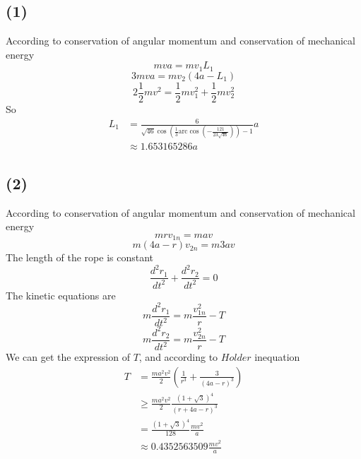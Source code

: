 \documentclass[12pt,a4paper,twocolumn]{article}%
\begin{document}
		\subsection*{(1)}
		\noindent According to conservation of angular momentum and conservation of mechanical energy
		\begin{equation}
			mva=mv_1L_1
		\end{equation}
		\begin{equation}
			3mva=mv_2(4a-L_1)
		\end{equation}
		\begin{equation}
			2\frac{1}{2}mv^2=\frac{1}{2}mv_1^2+\frac{1}{2}mv_2^2
		\end{equation}
		So 
		\begin{align*}
				L_1&=\frac{6}{\sqrt{46}\cos \left( \frac{1}{3}\mathrm{arc}\cos \left( -\frac{121}{23\sqrt{46}} \right) \right) -1}a \\
				&\approx1.653165286a
		\end{align*}
		\subsection*{(2)}
		\noindent According to conservation of angular momentum and conservation of mechanical energy
		\begin{equation}
			mrv_{1n}=mav
		\end{equation}
		\begin{equation}
			m(4a-r)v_{2n}=m3av
		\end{equation}
		The length of the rope is constant
		\begin{equation}
			\frac{d^2r_1}{dt^2}+\frac{d^2r_2}{dt^2}=0
		\end{equation}
		The kinetic equations are
		\begin{equation}
			m\frac{d^2r_1}{dt^2}=m\frac{v_{1n}^2}{r}-T
		\end{equation}
		\begin{equation}
			m\frac{d^2r_2}{dt^2}=m\frac{v_{2n}^2}{r}-T
		\end{equation}
		We can get the expression of $T$, and according to $Holder$ inequation
		\begin{align*}
		T&=\frac{ma^2v^2}{2}\left( \frac{1}{r^3}+\frac{3}{\left( 4a-r \right) ^3} \right) \\
		&\geqslant \frac{ma^2v^2}{2}\frac{\left( 1+\sqrt{3} \right) ^4}{\left( r+4a-r \right) ^3} \\
		&=\frac{\left( 1+\sqrt{3} \right) ^4}{128}\frac{mv^2}{a} \\
		&\approx 0.4352563509\frac{mv^2}{a}
		\end{align*}
		
		
\end{document}
